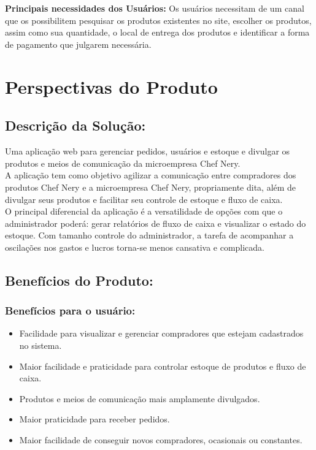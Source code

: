 \begin{apendicesenv}
\begin{tabular}{|l|p{3in}|}
\end{tabular}
\tab \\ \\
\textbf{Principais necessidades dos Usuários:} Os usuários necessitam de um canal que os possibilitem pesquisar os produtos existentes no site, escolher os produtos, assim como sua quantidade, o local de entrega dos produtos e identificar a forma de pagamento que julgarem necessária.   \\

{\large {\section { Perspectivas do Produto\\ } } }

\subsection{Descrição da Solução:}
Uma aplicação web para gerenciar pedidos, usuários e estoque e divulgar os produtos e meios de comunicação da microempresa Chef Nery. \\
\tab A aplicação tem como objetivo agilizar a comunicação entre compradores dos produtos Chef Nery e a microempresa Chef Nery, propriamente dita, além de divulgar seus produtos e facilitar seu controle de estoque e fluxo de caixa.\\
\tab O principal diferencial da aplicação é a  versatilidade de opções com que o administrador poderá: gerar relatórios de fluxo de caixa e visualizar o estado do estoque. Com tamanho controle do administrador, a tarefa de acompanhar a oscilações nos gastos e lucros torna-se menos cansativa e complicada.\\

\subsection{Benefícios do Produto:}
\subsubsection{Benefícios para o usuário:}
\begin{itemize}

\item Facilidade para visualizar e gerenciar compradores que estejam cadastrados no sistema.
\item Maior facilidade e praticidade para controlar estoque de produtos e fluxo de caixa.
\item Produtos e meios de comunicação mais amplamente divulgados.
\item Maior praticidade para receber pedidos.
\item Maior facilidade de conseguir novos compradores, ocasionais ou constantes.


\end{itemize}
\end{apendicesenv}
